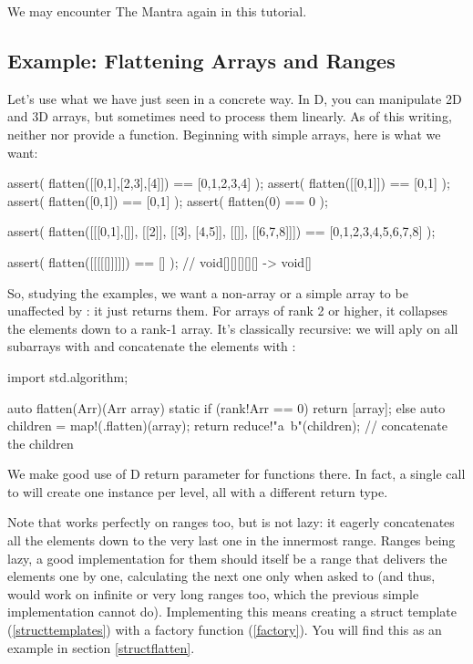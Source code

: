 We may encounter The Mantra again in this tutorial.

\subsection{Example: Flattening Arrays and Ranges}\label{functionflatten}

Let's use what we have just seen in a concrete way. In D, you can manipulate 2D and 3D arrays, but sometimes need to process them linearly. As of this writing, neither  nor  provide a  function. Beginning with simple arrays, here is what we want:

\begin{dcode}
assert( flatten([[0,1],[2,3],[4]]) == [0,1,2,3,4] );
assert( flatten([[0,1]]) == [0,1] );
assert( flatten([0,1]) == [0,1] );
assert( flatten(0) == 0 );

assert( flatten([[[0,1],[]], [[2]], [[3], [4,5]], [[]], [[6,7,8]]])
             == [0,1,2,3,4,5,6,7,8] );

assert( flatten([[[[[]]]]]) == [] ); // void[][][][][] -> void[]
\end{dcode}

So, studying the examples, we want a non-array or a simple array to be unaffected by : it just returns them. For arrays of rank 2 or higher, it collapses the elements down to a rank-1 array. It's classically recursive: we will aply  on all subarrays with  and concatenate the elements with :

\begin{dcode}
import std.algorithm;

auto flatten(Arr)(Arr array)
{
    static if (rank!Arr == 0)
        return [array];
    else
    {
        auto children = map!(.flatten)(array);
        return reduce!"a~b"(children); // concatenate the children
    }
}
\end{dcode}

We make good use of D  return parameter for functions there. In fact, a single call to  will create one instance per level, all with a different return type. 

Note that  works perfectly on ranges too, but is not lazy: it eagerly concatenates all the elements down to the very last one in the innermost range. Ranges being lazy, a good  implementation for them should itself be a range that delivers the elements one by one, calculating the next one only when asked to (and thus, would work on infinite or very long ranges too, which the previous simple implementation cannot do). Implementing this means creating a struct template (\ref{structtemplates}) with a factory function (\ref{factory}). You will find this as an example in section \ref{structflatten}.

